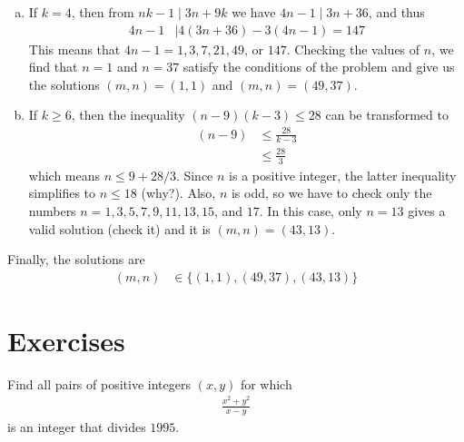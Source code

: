 \begin{solution}
\begin{enumerate}[(a)]
			\item If $k=4$, then from $nk-1\mid 3n+9k$ we have $4n-1\mid 3n+36$, and thus
				\begin{align*}
					4n-1
						& \mid 4(3n+36)-3(4n-1)=147
				\end{align*}
			This means that $4n-1=1, 3, 7, 21, 49$, or $147$. Checking the values of $n$, we find that $n=1$ and $n=37$ satisfy the conditions of the problem and give us the solutions $(m,n)=(1,1)$ and $(m,n)=(49,37)$.

			\item If $k\geq 6$, then the inequality $(n-9)(k-3) \leq 28$ can be transformed to
				\begin{align*}
					(n-9)
						& \leq \frac{28}{k-3}\\
						& \leq \frac{28}{3}
				\end{align*}
			which means $n\leq 9+28/3$. Since $n$ is a positive integer, the latter inequality simplifies to $n \leq 18$ (why?). Also, $n$ is odd, so we have to check only the numbers $n=1, 3, 5, 7, 9, 11, 13, 15$, and $17$. In this case, only $n=13$ gives a valid solution (check it) and it is $(m,n)=(43,13)$.
		\end{enumerate}
	Finally, the solutions are
		\begin{align*}
			(m,n)
				& \in\{(1,1), (49,37), (43,13)\}
		\end{align*}
\end{solution}
\newpage
\section{Exercises}


\begin{problem}
	Find all pairs of positive integers $(x, y)$ for which
		\begin{align*}
			\frac{x^2+y^2}{x-y}
		\end{align*}
	is an integer that divides $1995$.
\end{problem}

%

